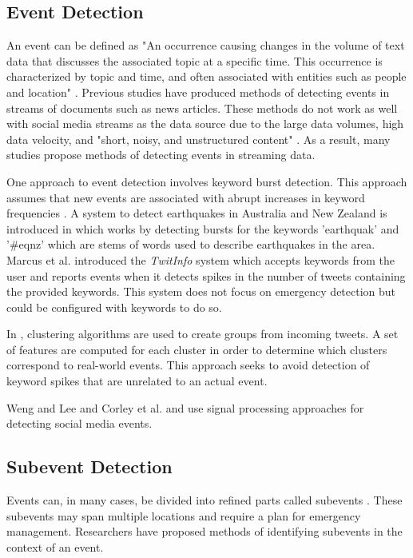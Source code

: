 \documentclass[conference]{IEEEtran}
\begin{document}
\subsection{Event Detection}
An event can be defined as "An occurrence causing changes in the volume of text data that discusses the associated topic at a specific time. This occurrence is characterized by topic and time, and often associated with entities such as people and location" \cite{dou}. Previous studies have produced methods of detecting events in streams of documents such as news articles. These methods do not work as well with social media streams as the data source due to the large data volumes, high data velocity, and "short, noisy, and unstructured content" \cite{Imran}. As a result, many studies propose methods of detecting events in streaming data.

One approach to event detection involves keyword burst detection. This approach assumes that new events are associated with abrupt increases in keyword frequencies \cite{Imran}. A system to detect earthquakes in Australia and New Zealand  is introduced in \cite{robinson} which works by detecting bursts for the keywords 'earthquak' and '\#eqnz' which are stems of words used to describe earthquakes in the area. Marcus et al. \cite{marcus2011twitinfo} introduced the \textit{TwitInfo} system which accepts keywords from the user and reports events when it detects spikes in the number of tweets containing the provided keywords. This system does not focus on emergency detection but could be configured with keywords to do so.

In \cite{becker2011beyond}, clustering algorithms are used to create groups from incoming tweets. A set of features are computed for each cluster in order to determine which clusters correspond to real-world events. This approach seeks to avoid detection of keyword spikes that are unrelated to an actual event.

Weng and Lee and Corley et al. \cite{Weng} and \cite{Corley} use signal processing approaches for detecting social media events.
\subsection{Subevent Detection}
Events can, in many cases, be divided into refined parts called subevents \cite{Pohl}. These subevents may span multiple locations and require a plan for emergency management. Researchers have proposed methods of identifying subevents in the context of an event. 
\end{document}
